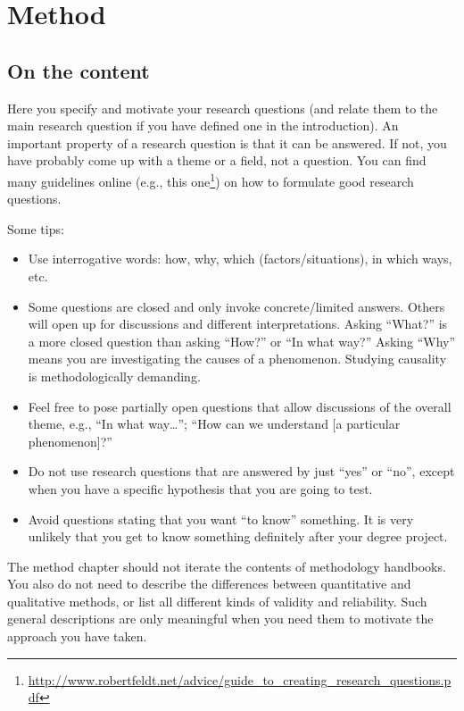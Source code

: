 \chapter{Method}
\label{chp:method}
\section{On the content}
Here you specify and motivate your research questions (and relate them to the main research question if you have defined one in the introduction). An important property of a research question is that it can be answered. If not, you have probably come up with a theme or a field, not a question. You can find many guidelines online (e.g., this one\footnote{\url{http://www.robertfeldt.net/advice/guide_to_creating_research_questions.pdf}}) on how to formulate good research questions.

Some tips:
\begin{itemize}
    \item Use interrogative words: how, why, which (factors/situations), in which ways, etc.
    \item Some questions are closed and only invoke concrete/limited answers. Others will open up for discussions and different interpretations.
    Asking ``What?'' is a more closed question than asking ``How?'' or ``In what way?'' Asking ``Why'' means you are investigating the causes of a phenomenon. Studying causality is methodologically demanding.
    \item Feel free to pose partially open questions that allow discussions of the overall theme, e.g., ``In what way\dots''; ``How can we understand [a particular phenomenon]?''
    \item Do not use research questions that are answered by just ``yes'' or ``no'', except when you have a specific hypothesis that you are going to test.
    \item Avoid questions stating that you want ``to know'' something. It is very unlikely that you get to know something definitely after your degree project.
\end{itemize}

The method chapter should not iterate the contents of methodology handbooks. You also do not need to describe the differences between quantitative and qualitative methods, or list all different kinds of validity and reliability. Such general descriptions are only meaningful when you need them to motivate the approach you have taken.

